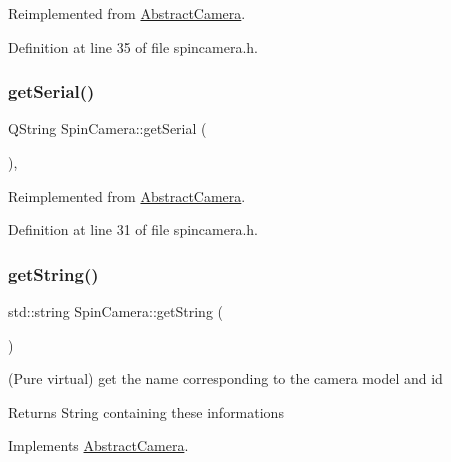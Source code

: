 Reimplemented from \mbox{\hyperlink{class_abstract_camera_ae263e210c55f094ef5b8fc8cb3341043}{Abstract\+Camera}}.



Definition at line 35 of file spincamera.\+h.

\mbox{\label{class_spin_camera_a2427902f7a8bc6cca397966b14399e9b}} 
\subsubsection{\texorpdfstring{getSerial()}{getSerial()}}
{\footnotesize\ttfamily Q\+String Spin\+Camera\+::get\+Serial (\begin{DoxyParamCaption}{ }\end{DoxyParamCaption})\hspace{0.3cm}{\ttfamily [inline]}, {\ttfamily [virtual]}}



Reimplemented from \mbox{\hyperlink{class_abstract_camera_a0dcd65fa3bcc83ba95ffdb0a9044a407}{Abstract\+Camera}}.



Definition at line 31 of file spincamera.\+h.

\mbox{\label{class_spin_camera_ad3b02eb926fbc4312e7f19e3834db576}} 
\subsubsection{\texorpdfstring{getString()}{getString()}}
{\footnotesize\ttfamily std\+::string Spin\+Camera\+::get\+String (\begin{DoxyParamCaption}{ }\end{DoxyParamCaption})\hspace{0.3cm}{\ttfamily [virtual]}}



(Pure virtual) get the name corresponding to the camera model and id 

\begin{DoxyReturn}{Returns}
String containing these informations 
\end{DoxyReturn}


Implements \mbox{\hyperlink{class_abstract_camera_a75dc6b53d5a8717944d5e8ded9609611}{Abstract\+Camera}}.



